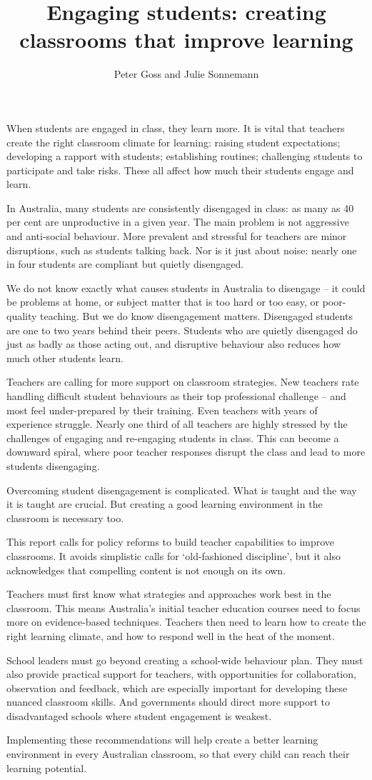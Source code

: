 \documentclass[FrontPage]{grattan}
\author{Peter Goss and Julie Sonnemann}
\title{Engaging students: creating classrooms that improve learning}
\begin{document}
\begin{overview}
When students are engaged in class, they learn more. It is vital that teachers create the right classroom climate for learning: raising student expectations; developing a rapport with students; establishing routines; challenging students to participate and take risks. These all affect how much their students engage and learn.
 
In Australia, many students are consistently disengaged in class: as many as 40 per cent are unproductive in a given year. The main problem is not aggressive and anti-social behaviour. More prevalent and stressful for teachers are minor disruptions, such as students talking back. Nor is it just about noise: nearly one in four students are compliant but quietly disengaged. 
 
We do not know exactly what causes students in Australia to disengage – it could be problems at home, or subject matter that is too hard or too easy, or poor-quality teaching. But we do know disengagement matters. Disengaged students are one to two years behind their peers. Students who are quietly disengaged do just as badly as those acting out, and disruptive behaviour also reduces how much other students learn.
 
Teachers are calling for more support on classroom strategies. New teachers rate handling difficult student behaviours as their top professional challenge – and most feel under-prepared by their training. Even teachers with years of experience struggle. Nearly one third of all teachers are highly stressed by the challenges of engaging and re-engaging students in class. This can become a downward spiral, where poor teacher responses disrupt the class and lead to more students disengaging. 
 
Overcoming student disengagement is complicated. What is taught and the way it is taught are crucial. But creating a good learning environment in the classroom is necessary too.
 
This report calls for policy reforms to build teacher capabilities to improve classrooms. It avoids simplistic calls for ‘old-fashioned discipline’, but it also acknowledges that compelling content is not enough on its own. 
 
Teachers must first know what strategies and approaches work best in the classroom. This means Australia’s initial teacher education courses need to focus more on evidence-based techniques. Teachers then need to learn how to create the right learning climate, and how to respond well in the heat of the moment. 
 
School leaders must go beyond creating a school-wide behaviour plan. They must also provide practical support for teachers, with opportunities for collaboration, observation and feedback, which are especially important for developing these nuanced classroom skills. And governments should direct more support to disadvantaged schools where student engagement is weakest.

Implementing these recommendations will help create a better learning environment in every Australian classroom, so that every child can reach their learning potential.
\end{overview}
\end{document}
